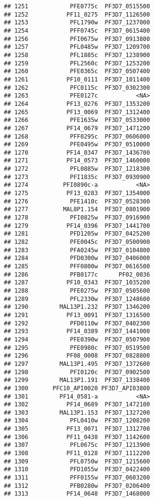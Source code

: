 \documentclass{article}\usepackage[]{graphicx}\usepackage[]{color}
\makeatletter
\newenvironment{kframe}{%
 \def\at@end@of@kframe{}%
 \ifinner\ifhmode%
  \def\at@end@of@kframe{\end{minipage}}%
  \begin{minipage}{\columnwidth}%
 \fi\fi%
 \def\FrameCommand##1{\hskip\@totalleftmargin \hskip-\fboxsep
 \colorbox{shadecolor}{##1}\hskip-\fboxsep
     \hskip-\linewidth \hskip-\@totalleftmargin \hskip\columnwidth}%
 \MakeFramed {\advance\hsize-\width
   \@totalleftmargin\z@ \linewidth\hsize
   \@setminipage}}%
 {\par\unskip\endMakeFramed%
 \at@end@of@kframe}
\newenvironment{knitrout}{}{} %
\makeatother
\begin{document}
\begin{knitrout}
\begin{kframe}
\begin{verbatim}
## 1251            PFE0775c  PF3D7_0515500
## 1252           PF11_0275  PF3D7_1126500
## 1253            PFL1790w  PF3D7_1237000
## 1254            PFF0745c  PF3D7_0615400
## 1256            PFI0675w  PF3D7_0913800
## 1257            PFL0485w  PF3D7_1209700
## 1258            PFL1885c  PF3D7_1238900
## 1259            PFL2560c  PF3D7_1253200
## 1260            PFE0365c  PF3D7_0507400
## 1261           PF10_0111  PF3D7_1011400
## 1262            PFC0115c  PF3D7_0302300
## 1263            PFE0127c           <NA>
## 1264           PF13_0276  PF3D7_1353200
## 1265           PF13_0069  PF3D7_1312400
## 1266            PFE1635w  PF3D7_0533000
## 1267           PF14_0679  PF3D7_1471200
## 1268            PFF0295c  PF3D7_0606000
## 1269            PFE0495w  PF3D7_0510000
## 1270           PF14_0347  PF3D7_1436700
## 1271           PF14_0573  PF3D7_1460000
## 1272            PFL0885w  PF3D7_1218300
## 1273            PFI1835c  PF3D7_0930900
## 1274          PFI0890c-a           <NA>
## 1275           PF13_0283  PF3D7_1354000
## 1276            PFE1410c  PF3D7_0528300
## 1277          MAL8P1.154  PF3D7_0801900
## 1278            PFI0825w  PF3D7_0916900
## 1279           PF14_0396  PF3D7_1441700
## 1281            PFD1205w  PF3D7_0425200
## 1282            PFE0045c  PF3D7_0500900
## 1283            PFA0245w  PF3D7_0104800
## 1284            PFD0300w  PF3D7_0406000
## 1285            PFF0800w  PF3D7_0616500
## 1286            PFB0177c      PF02_0036
## 1287           PF10_0343  PF3D7_1035200
## 1288            PFE0275w  PF3D7_0505600
## 1289            PFL2330w  PF3D7_1248600
## 1290         MAL13P1.232  PF3D7_1346200
## 1291           PF13_0091  PF3D7_1316500
## 1292            PFD0110w  PF3D7_0402300
## 1293           PF14_0389  PF3D7_1441000
## 1294            PFE0390w  PF3D7_0507900
## 1295            PFE0980c  PF3D7_0519500
## 1296           PF08_0008  PF3D7_0828800
## 1297         MAL13P1.495  PF3D7_1372600
## 1298            PFI0120c  PF3D7_0902500
## 1299         MAL13P1.191  PF3D7_1338400
## 1300       PFC10_API0020 PF3D7_API03800
## 1301         PF14_0581-a           <NA>
## 1302           PF14_0689  PF3D7_1472100
## 1303         MAL13P1.153  PF3D7_1327200
## 1304            PFL0410w  PF3D7_1208200
## 1305           PF13_0071  PF3D7_1312700
## 1306           PF11_0438  PF3D7_1142600
## 1307            PFL0675c  PF3D7_1213900
## 1308           PF11_0128  PF3D7_1112200
## 1309            PFL0750w  PF3D7_1215600
## 1310            PFD1055w  PF3D7_0422400
## 1311            PFF0155w  PF3D7_0603200
## 1312            PFB0280w  PF3D7_0206400
## 1313           PF14_0648  PF3D7_1468000

\end{verbatim}
\end{kframe}
\end{knitrout}
\end{document}
